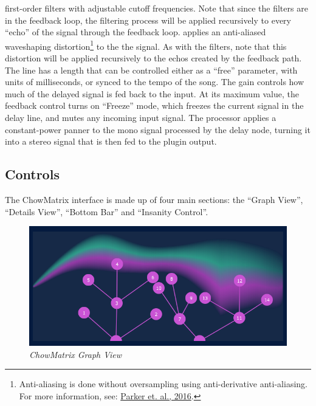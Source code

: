 \documentclass[landscape,twocolumn,a5paper]{manual}
\begin{document}
first-order filters with adjustable cutoff frequencies.
Note that since the filters are in the feedback loop,
the filtering process will be applied recursively to every
``echo'' of the signal through the feedback loop.
\newpar
{} applies an anti-aliased waveshaping
distortion\footnote{Anti-aliasing is done without oversampling using anti-derivative anti-aliasing. For more information, see: \href{http://dafx16.vutbr.cz/dafxpapers/20-DAFx-16_paper_41-PN.pdf}{Parker et. al., 2016}.}
to the the signal. As with the filters, note that this
distortion will be applied recursively to the echos created
by the feedback path.
\newpar
The  line has a length that can be
controlled either as a ``free'' parameter, with units
of milliseconds, or synced to the tempo of the song.
\newpar
The  gain controls how much of the
delayed signal is fed back to the input. At its maximum
value, the feedback control turns on ``Freeze'' mode, which
freezes the current signal in the delay line, and mutes
any incoming input signal.
\newpar
The  processor applies a constant-power
panner to the mono signal processed by the delay node,
turning it into a stereo signal that is then fed to the
plugin output.

\subsection{Controls}
The ChowMatrix interface is made up of four main sections:
the ``Graph View'', ``Details View'', ``Bottom Bar''
and ``Insanity Control''.

\begin{figure}[ht]
    \center
    \includegraphics[width=0.75\columnwidth]{screenshots/GraphView.png}
    \caption{\label{fig:graph_view}{\it ChowMatrix Graph View}}
\end{figure}
\end{document}
